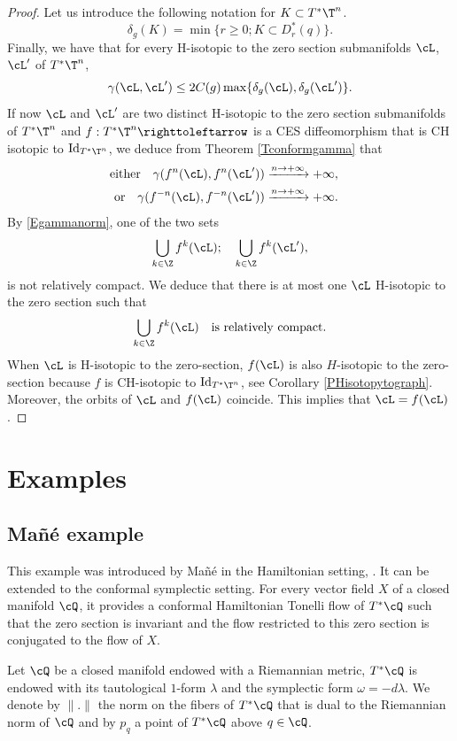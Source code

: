 \begin{proof}
Let us introduce the following notation for $K\subset T^*\T^n$.
\[
\delta_g(K)=\min\{r\geq 0; K\subset D^*_r(q)\}.
\]
Finally, we have that for every H-isotopic to the zero section submanifolds $\cL$, $\cL'$ of $T^*\T^n$,
\begin{equation}\label{Egammanorm}
\gamma(\cL, \cL')\leq 2C(g)\max\{\delta_g(\cL), \delta_g(\cL')\}.
\end{equation}
If now $\cL$ and $\cL'$ are two distinct H-isotopic to the zero section submanifolds of $T^*\T^n$ and $f: T^*\T^n \righttoleftarrow$ is a CES diffeomorphism that is CH isotopic to ${\rm Id}_{T^*\T^n}$, we deduce from Theorem \ref{Tconformgamma} that
\begin{align*}
\text{either}\quad\gamma (f^n(\cL), f^n(\cL'))&\xrightarrow[]{n\to +\infty}+\infty,\quad
\\
\text{or}\quad\gamma (f^{-n}(\cL), f^{-n}(\cL'))&\xrightarrow[]{n\to +\infty}+\infty.
\end{align*}
By \eqref{Egammanorm}, one of the two sets
\[
\bigcup_{k\in\Z}f^k(\cL);\quad \bigcup_{k\in\Z}f^k(\cL'),
\]
is not relatively compact. We deduce that there is at most one $\cL$ H-isotopic to the zero section such that
\[
\bigcup_{k\in\Z}f^k(\cL)\quad\text{is relatively compact}.
\]
When $\cL$ is H-isotopic to the zero-section, $f(\cL)$ is also $H$-isotopic to the zero-section because $f$ is CH-isotopic to ${\rm Id}_{T^*\T^n}$, see Corollary \ref{PHisotopytograph}. Moreover, the orbits of $\cL$ and $f(\cL)$ coincide. This implies that $\cL=f(\cL)$.
\end{proof}

\section{Examples}\label{AExamples}

\subsection{Mañé example}\label{SecMan}

This example was introduced by Mañé in the Hamiltonian setting, \cite{Man1992}. It can be extended to the conformal symplectic setting. For every vector field $X$ of a closed manifold $\cQ$, it provides a conformal Hamiltonian Tonelli flow of $T^*\cQ$ such that the zero section is invariant and the flow restricted to this zero section is conjugated to the flow of $X$.

Let $\cQ$ be a closed manifold endowed with a Riemannian metric, $T^*\cQ$ is endowed with its tautological $1$-form $\lambda$ and the symplectic form $\omega=-d\lambda$. We denote by $\|.\|$ the norm on the fibers of $T^*\cQ$ that is dual to the Riemannian norm of $\cQ$ and by $p_q$ a point of $T^*\cQ$ above $q \in \cQ$.

